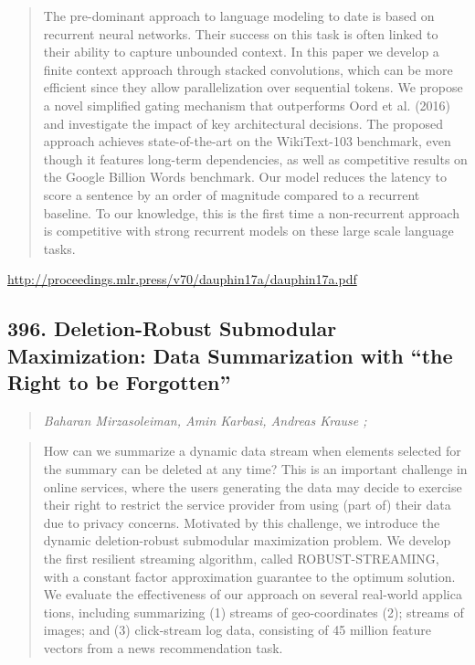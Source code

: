\documentclass{article}
\begin{document}
\begin{quote}
    The pre-dominant approach to language modeling to date is based on recurrent neural networks. Their success on this task is often linked to their ability to capture unbounded context. In this paper we develop a finite context approach through stacked convolutions, which can be more efficient since they allow parallelization over sequential tokens. We propose a novel simplified gating mechanism that outperforms Oord et al. (2016) and investigate the impact of key architectural decisions. The proposed approach achieves state-of-the-art on the WikiText-103 benchmark, even though it features long-term dependencies, as well as competitive results on the Google Billion Words benchmark. Our model reduces the latency to score a sentence by an order of magnitude compared to a recurrent baseline. To our knowledge, this is the first time a non-recurrent approach is competitive with strong recurrent models on these large scale language tasks.  
\end{quote}

\href{http://proceedings.mlr.press/v70/dauphin17a/dauphin17a.pdf}{http://proceedings.mlr.press/v70/dauphin17a/dauphin17a.pdf}

\subsection{396. Deletion-Robust Submodular Maximization: Data Summarization with “the Right to be Forgotten”}

\begin{quote}
\footnotesize{\textit{Baharan Mirzasoleiman, Amin Karbasi, Andreas Krause ;}}

\end{quote}

\begin{quote}
    How can we summarize a dynamic data stream when elements selected for the summary can be deleted at any time? This is an important challenge in online services, where the users generating the data may decide to exercise their right to restrict the service provider from using (part of) their data due to privacy concerns. Motivated by this challenge, we introduce the dynamic deletion-robust submodular maximization problem. We develop the first resilient streaming algorithm, called ROBUST-STREAMING, with a constant factor approximation guarantee to the optimum solution. We evaluate the effectiveness of our approach on several real-world applica tions, including summarizing (1) streams of geo-coordinates (2); streams of images; and (3) click-stream log data, consisting of 45 million feature vectors from a news recommendation task.  
\end{quote}
\end{document}
